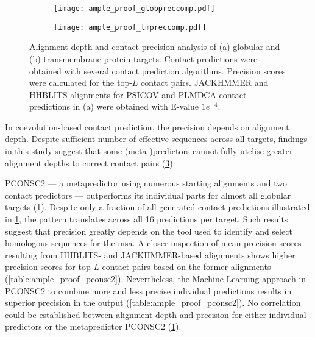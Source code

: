\begin{figure}[H]
    \centering
    \begin{subfigure}[b]{\textwidth}
        \centering
        \texttt{[image: ample\_proof\_globpreccomp.pdf]}
        \caption{}
        \label{fig:ample_proof_globpreccomp}
    \end{subfigure}
    
    \begin{subfigure}[b]{\textwidth}
        \centering
        \texttt{[image: ample\_proof\_tmpreccomp.pdf]}
        \caption{}
        \label{fig:ample_proof_tmpreccomp}
    \end{subfigure}
    
    \caption[Alignment depth and contact precision analysis of globular and transmembrane protein targets]{Alignment depth and contact precision analysis of (a) globular and (b) transmembrane protein targets. Contact predictions were obtained with several contact prediction algorithms. Precision scores were calculated for the top-$L$ contact pairs. JACKHMMER and HHBLITS alignments for PSICOV and PLMDCA contact predictions in (a) were obtained with E-value $1e^{-4}$.} 
    \label{fig:ample_proof_preccomp}
\end{figure}

In coevolution-based contact prediction, the precision depends on alignment depth. Despite sufficient number of effective sequences across all targets, findings in this study suggest that some (meta-)predictors cannot fully utelise greater alignment depths to correct contact pairs (\cref{fig:ample_proof_preccomp}). 

PCONSC2 --- a metapredictor using numerous starting alignments and two contact predictors --- outperforms its individual parts for almost all globular targets (\cref{fig:ample_proof_globpreccomp}). Despite only a fraction of all generated contact predictions illustrated in \cref{fig:ample_proof_globpreccomp}, the pattern translates across all 16 predictions per target. Such results suggest that precision greatly depends on the tool used to identify and select homologous sequences for the \gls{msa}. A closer inspection of mean precision scores resulting from HHBLITS- and JACKHMMER-based alignments shows higher precision scores for top-$L$ contact pairs based on the former alignments (\cref{table:ample_proof_pconsc2}). Nevertheless, the Machine Learning approach in PCONSC2 to combine more and less precise individual predictions results in superior precision in the output (\cref{table:ample_proof_pconsc2}). No correlation could be established between alignment depth and precision for either individual predictors or the metapredictor PCONSC2 (\cref{fig:ample_proof_globpreccomp}). 

